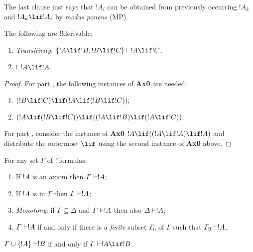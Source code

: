 \documentclass[../../include/open-logic-section]{subfiles}
\begin{document}
\begin{explain} 
The last clause just says that $!A_i$ can be obtained from previously
occurring $!A_k$ and $!A_k \lif !A_i$ by \emph{modus ponens} (MP).
\end{explain}

\begin{prop}
The following are !!{derivable}:
\begin{enumerate} 
\item {} \emph{Transitivity}: $\{!A \lif
  !B, !B \lif !C\} \Proves !A \lif !C$.
\item {} $\Proves !A \lif !A$.
\end{enumerate} 
\end{prop}

\begin{proof} 
For part , the
following instances of \textbf{Ax0} are needed: 
\begin{enumerate} 
\item $(!B \lif !C) \lif (!A \lif (!B \lif !C));$ 
\item $(!A \lif (!B \lif !C))\lif ((!A \lif !B) \lif (!A \lif !C))$. 
\end{enumerate} 
For part , consider the instance of
\textbf{Ax0} $!A \lif ((!A \lif !A) \lif !A)$ and distribute the
outermost $\lif$ using the second instance of \textbf{Ax0} above.
\end{proof}

\begin{prop}
For any set $\Gamma$ of !!{formula}s:
\begin{enumerate} 
\item If $!A$ is an axiom then $\Gamma \Proves !A$; 
\item {} If $!A$ is in $\Gamma$ then
  $\Gamma \Proves !A$;
\item {} \emph{Monotony}: if $\Gamma
  \subseteq \Delta$ and $\Gamma \Proves !A$ then also $\Delta \Proves
  !A$;
\item $\Gamma \Proves !A$ if and only if there is a \emph{finite}
  subset $\Gamma_0$ of $\Gamma$ such that $\Gamma_0 \Proves !A$.
\end{enumerate} 
\end{prop}

\begin{thm}
$\Gamma \cup \{!A\} \Proves !B$ if and only if $\Gamma \Proves !A \lif
!B$.
\end{thm} 
\end{document}
